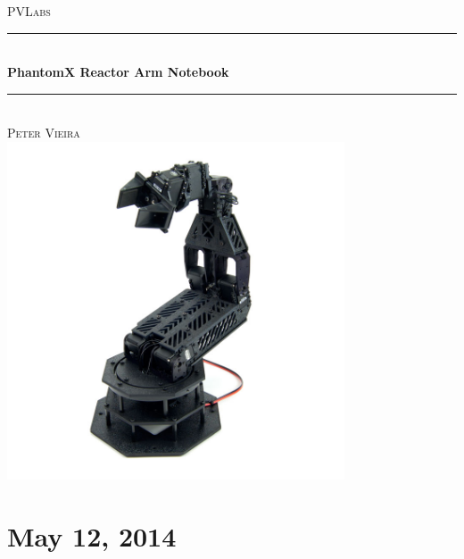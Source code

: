 \documentclass[letterpaper, 10 pt]{report}
\begin{document}
\begin{titlepage}
\center
\textsc{\LARGE PVLabs}\\[1.5cm]

\rule{\linewidth}{0.5mm}\\[0.4cm]
{\huge \bfseries PhantomX Reactor Arm Notebook}\\[0.4cm]
\rule{\linewidth}{0.5mm}\\[1.5cm]
\textsc{\normalsize Peter Vieira}\\[1.5cm]
\includegraphics[width=10.0cm]{resources/phantomx-reactor}
\vfill
\end{titlepage}



\section*{May 12, 2014}
\end{document}
